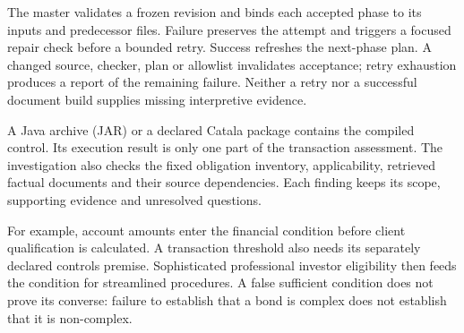 The master validates a frozen revision and binds each accepted phase to its
inputs and predecessor files.
Failure preserves the attempt and triggers a focused repair check before a
bounded retry. Success refreshes the next-phase plan. A changed source, checker,
plan or allowlist invalidates acceptance; retry exhaustion produces a report of
the remaining failure. Neither a retry nor a successful document build supplies
missing interpretive evidence.

\clearpage
{}
A Java archive (JAR) or a declared Catala package contains the compiled
control. Its execution result is only one part of the transaction assessment.
The investigation also checks the fixed obligation inventory, applicability,
retrieved factual documents and their source dependencies. Each finding keeps
its scope, supporting evidence and unresolved questions.

\begin{MapDiagram}
\end{MapDiagram}

For example, account amounts enter the financial condition before client
qualification is calculated. A transaction threshold also needs its separately
declared controls premise. Sophisticated professional investor eligibility then
feeds the condition for streamlined procedures. A false sufficient condition
does not prove its converse: failure to establish that a bond is complex does
not establish that it is non-complex.

